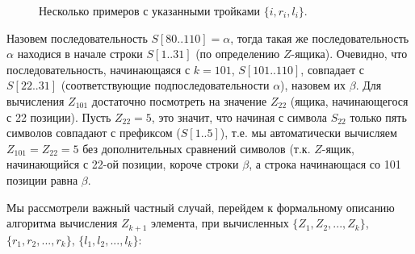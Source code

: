\documentclass[letterpaper, 11pt]{article}
\begin{document}
\begin{figure}[H]
  \caption{Несколько примеров с указанными тройками $\{i, r_i, l_i\}$.}
\end{figure}
\par
Назовем последовательность $S[80..110] = \alpha$, тогда такая же последовательность $\alpha$ находися в начале строки $S[1..31]$ (по определению $Z$-ящика). Очевидно, что последовательность, начинающаяся с $k = 101$, $S[101..110]$, совпадает с $S[22..31]$ (соответствующие подпоследовательности $\alpha$), назовем их $\beta$. Для вычисления $Z_{101}$ достаточно посмотреть на значение $Z_{22}$ (ящика, начинающегося с 22 позиции). Пусть $Z_{22} = 5$, это значит, что начиная с символа $S_{22}$ только пять символов совпадают с префиксом ($S[1..5]$), т.е. мы автоматически вычисляем $Z_{101} = Z_{22} = 5$ без дополнительных сравнений символов (т.к. $Z$-ящик, начинающийся с 22-ой позиции, короче строки $\beta$, а строка начинающася со 101 позиции равна $\beta$.
\par
Мы рассмотрели важный частный случай, перейдем к формальному описанию алгоритма вычисления $Z_{k+1}$ элемента, при вычисленных $\{Z_1, Z_2, ..., Z_k\}$, $\{r_1, r_2, ..., r_k\}$, $\{l_1, l_2, ..., l_k\}$:
\end{document}
